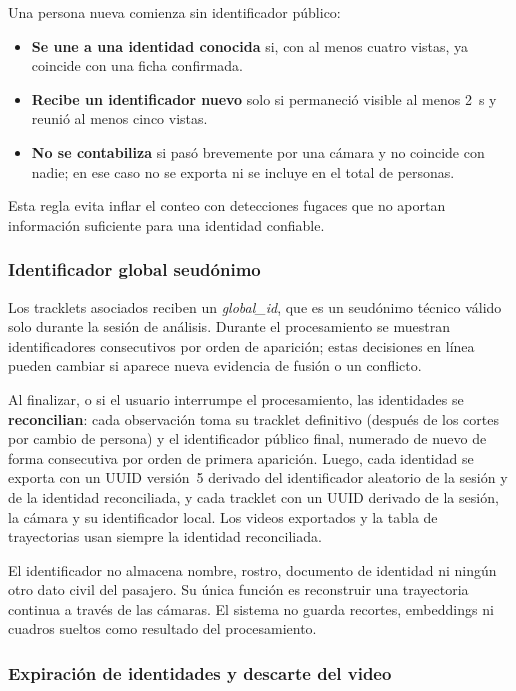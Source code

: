 \documentclass[12pt,a4paper]{article}
\begin{document}
Una persona nueva comienza sin identificador público:

\begin{itemize}
    \item \textbf{Se une a una identidad conocida} si, con al menos
    cuatro vistas, ya coincide con una ficha confirmada.
    \item \textbf{Recibe un identificador nuevo} solo si permaneció
    visible al menos 2~s y reunió al menos cinco vistas.
    \item \textbf{No se contabiliza} si pasó brevemente por una cámara y
    no coincide con nadie; en ese caso no se exporta ni se incluye en el
    total de personas.
\end{itemize}

Esta regla evita inflar el conteo con detecciones fugaces que no aportan
información suficiente para una identidad confiable.

\subsubsection{Identificador global seudónimo}

Los tracklets asociados reciben un \textit{global\_id}, que es un
seudónimo técnico válido solo durante la sesión de análisis. Durante el
procesamiento se muestran identificadores consecutivos por orden de
aparición; estas decisiones en línea pueden cambiar si aparece nueva
evidencia de fusión o un conflicto.

Al finalizar, o si el usuario interrumpe el procesamiento, las
identidades se \textbf{reconcilian}: cada observación toma su tracklet
definitivo (después de los cortes por cambio de persona) y el
identificador público final, numerado de nuevo de forma consecutiva por
orden de primera aparición. Luego, cada identidad se exporta con un UUID
versión~5 derivado del identificador aleatorio de la sesión y de la
identidad reconciliada, y cada tracklet con un UUID derivado de la
sesión, la cámara y su identificador local. Los videos exportados y la
tabla de trayectorias usan siempre la identidad reconciliada.

El identificador no almacena nombre, rostro, documento de identidad ni
ningún otro dato civil del pasajero. Su única función es reconstruir una
trayectoria continua a través de las cámaras. El sistema no guarda
recortes, embeddings ni cuadros sueltos como resultado del
procesamiento.

\subsubsection{Expiración de identidades y descarte del video}
\end{document}
